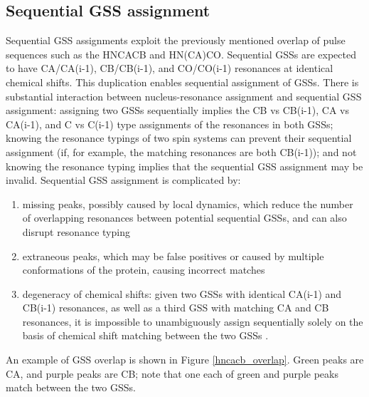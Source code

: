 \subsection*{Sequential GSS assignment}
Sequential GSS assignments exploit the previously mentioned overlap of pulse
sequences such as the HNCACB and HN(CA)CO.  Sequential GSSs 
are expected to have CA/CA(i-1), CB/CB(i-1), and CO/CO(i-1) resonances at 
identical chemical shifts.  This duplication enables sequential assignment 
of GSSs.  There is substantial interaction between nucleus-resonance 
assignment and sequential GSS assignment: assigning two GSSs sequentially 
implies the CB vs CB(i-1), CA vs CA(i-1), and C vs C(i-1) type assignments 
of the resonances in both GSSs; knowing the resonance typings of 
two spin systems can prevent their sequential assignment (if, for example, the 
matching resonances are both CB(i-1)); and not knowing the resonance typing 
implies that the sequential GSS assignment may be invalid.  
Sequential GSS assignment is complicated by: 
\begin{enumerate}
  \item missing peaks, possibly caused 
  by local dynamics, which reduce the number of overlapping resonances between 
  potential sequential GSSs, and can also disrupt resonance typing 
  \item extraneous peaks, which may be false positives or caused by 
  multiple conformations of the protein, causing incorrect matches
  \item degeneracy of chemical shifts:  given two GSSs with identical CA(i-1) 
  and CB(i-1) resonances, as well as a third GSS with matching CA and CB 
  resonances, it is impossible to unambiguously assign sequentially solely 
  on the basis of chemical shift matching between the two GSSs 
  \cite{autoassign1997}.
\end{enumerate}

An example of GSS overlap is shown in Figure \ref{hncacb_overlap}.  Green peaks
are CA, and purple peaks are CB; note that one each of green and purple peaks
match between the two GSSs.

